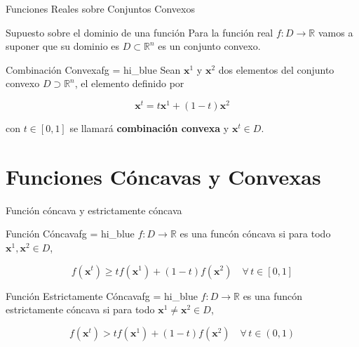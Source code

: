 \documentclass[10pt,aspectratio=169]{beamer}  %
\begin{document}
\begin{frame}{Funciones Reales sobre Conjuntos Convexos}

	\begin{alertblock}{Supuesto sobre el dominio de una función}
		Para la función real $f: D \rightarrow \mathbb{R}$ vamos a suponer que su dominio es $D \subset \mathbb{R}^n$
		es un conjunto convexo.	
	\end{alertblock}
	
	\begin{varblock}{Combinación Convexa}{fg = hi_blue}
		Sean $\mathbf{x}^1$ y $\mathbf{x}^2$ dos elementos del conjunto convexo $D \supset \mathbb{R}^n$, el elemento definido por 

		\[\mathbf{x}^t = t \mathbf{x}^1 + (1-t) \mathbf{x}^2\]
	
		 con $t \in [0, 1]$ se llamará \textbf{combinación convexa}  y $\mathbf{x}^t \in D$.   
	\end{varblock}

\end{frame}


% 
\section{Funciones Cóncavas y Convexas}

\begin{frame}{Función cóncava y estrictamente cóncava}

	\begin{varblock}{Función Cóncava}{fg = hi_blue}
		$f: D \rightarrow \mathbb{R}$ es una funcón cóncava si para todo $\mathbf{x}^1, \mathbf{x}^2 \in D$,
		
		\[ f(\mathbf{x}^t) \geq t f(\mathbf{x}^1) + (1 - t) f(\mathbf{x}^2)   \quad   \forall \, t \in [0,1] \]
	\end{varblock}

	\begin{varblock}{Función Estrictamente Cóncava}{fg = hi_blue}
		$f: D \rightarrow \mathbb{R}$ es una funcón estrictamente cóncava si para todo $\mathbf{x}^1 \neq  \mathbf{x}^2 \in D$,
		
		\[ f(\mathbf{x}^t) > t f(\mathbf{x}^1) + (1 - t) f(\mathbf{x}^2)   \quad   \forall \, t \in (0,1) \]
	\end{varblock}

\end{frame}
\end{document}

